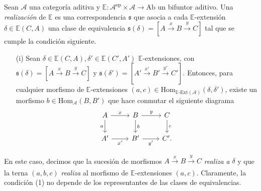 \documentclass[tesis]{subfiles}
\begin{document}
\begin{Def}\cite[Definition 2.9]{NakaokaPalu}\label{NakaokaPalu-2.9}
    Sean $\mathscr{A}$ una categoría aditiva y $\mathbb{E}:\mathscr{A}^\text{op}\times\mathscr{A}\to \text{Ab}$ un bifuntor aditivo. Una \emph{realización} de $\mathbb{E}$ es una correspondencia $\mathfrak{s}$ que asocia a cada $\mathbb{E}$-extensión $\delta\in\mathbb{E}(C,A)$ una clase de equivalencia $\mathfrak{s}(\delta) = [A\xrightarrow[]{x}B\xrightarrow[]{y}C]$ tal que se cumple la condición siguiente.

    \begin{itemize}
    
        \item[(i)] Sean $\delta\in\mathbb{E}(C,A), \delta'\in\mathbb{E}(C',A')$ $\mathbb{E}$-extensiones, con $\mathfrak{s}(\delta) = [A\xrightarrow[]{x}B\xrightarrow[]{y}C]$ y $\mathfrak{s}(\delta') = [A'\xrightarrow[]{x'}B'\xrightarrow[]{y'}C']$. Entonces, para cualquier morfismo de $\mathbb{E}$-extensiones $(a,c)\in\text{Hom}_{\mathbb{E}\text{-Ext}(\mathscr{A})}(\delta,\delta')$, existe un morfismo $b\in\text{Hom}_\mathscr{A}(B,B')$ que hace conmutar el siguiente diagrama
            \begin{equation}\label{eq: realización de un morfismo de E-extensiones}
                \begin{tikzcd}
                    A \arrow[]{d}[swap]{a} \arrow[]{r}[]{x} &B \arrow[]{d}[]{b} \arrow[]{r}[]{y} &C \arrow[]{d}[]{c } \\
                    A' \arrow[]{r}[swap]{x'} &B' \arrow[]{r}[swap]{y'} &C'.
                \end{tikzcd}
            \end{equation}
    \end{itemize}
    En este caso, decimos que la sucesión de morfismos $A\xrightarrow[]{x}B\xrightarrow[]{y}C$ \emph{realiza a} $\delta$ y que la terna $(a,b,c)$ \emph{realiza} al morfismo de $\mathbb{E}$-extensiones $(a,c)$. Claramente, la condición (1) no depende de los representantes de las clases de equivalencias.%
\end{Def}
\end{document}

